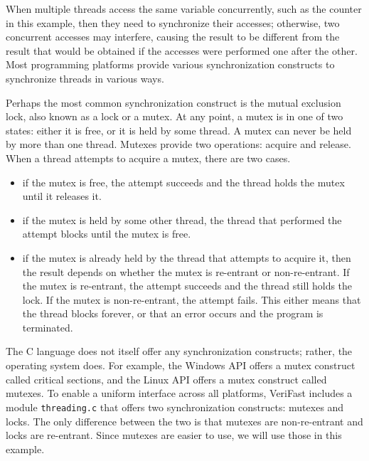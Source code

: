 \documentclass{article}
\begin{document}
When multiple threads access the same variable concurrently,
such as the counter in this example, then they need to
synchronize their accesses; otherwise, two concurrent accesses
may interfere, causing the result to be different from the
result that would be obtained if the accesses were performed
one after the other. Most programming platforms provide various
synchronization constructs to synchronize threads in various
ways.

Perhaps the most common synchronization construct is the mutual
exclusion lock, also known as a lock or a mutex. At any point,
a mutex is in one of two states: either it is free, or it is
held by some thread. A mutex can never be held by more than one
thread. Mutexes provide two operations: acquire and release.
When a thread attempts to acquire a mutex, there are two cases.
\begin{itemize}
\item if the mutex is free, the attempt succeeds and the
    thread holds the mutex until it releases it.
\item if the mutex is held by some other thread, the thread
    that performed the attempt blocks until the mutex is
    free.
\item if the mutex is already held by the thread that
    attempts to acquire it, then the result depends on
    whether the mutex is re-entrant or non-re-entrant. If
    the mutex is re-entrant, the attempt succeeds and the
    thread still holds the lock. If the mutex is
    non-re-entrant, the attempt fails. This either means
    that the thread blocks forever, or that an error occurs
    and the program is terminated.
\end{itemize}

The C language does not itself offer any synchronization
constructs; rather, the operating system does. For example, the
Windows API offers a mutex construct called critical sections,
and the Linux API offers a mutex construct called mutexes. To
enable a uniform interface across all platforms, VeriFast
includes a module \texttt{threading.c} that offers two
synchronization constructs: mutexes and locks. The only
difference between the two is that mutexes are non-re-entrant
and locks are re-entrant. Since mutexes are easier to use, we
will use those in this example.
\end{document}
